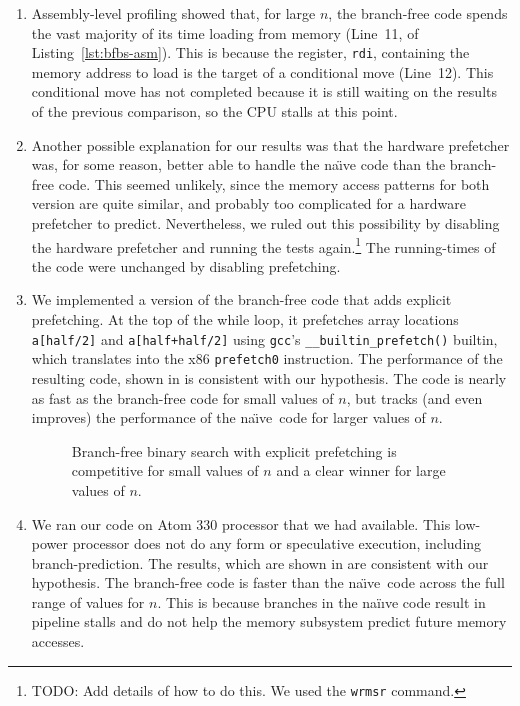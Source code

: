 \documentclass{patmorin}
\newcommand{\lstref}[1]{Listing~\ref{lst:#1}}
\newcommand{\naive}{na\"{\i}ve}
\begin{document}
\begin{enumerate}
\item Assembly-level profiling showed that, for large $n$, the
  branch-free code spends the vast majority of its time loading from
  memory (Line~11, of \lstref{bfbs-asm}).  This is because the register,
  \texttt{rdi},  containing the memory address to load is the
  target of a conditional move (Line~12).  This conditional move has not
  completed because it is still waiting on the results of the previous
  comparison, so the CPU stalls at this point.

\item Another possible explanation for our results was that the hardware
   prefetcher was, for some reason, better able to handle the \naive
   code than the branch-free code.  This seemed unlikely, since the memory
   access patterns for both version are quite similar, and probably too
   complicated for a hardware prefetcher to predict. Nevertheless, we
   ruled out this possibility by disabling the hardware prefetcher and
   running the tests again.\footnote{TODO: Add details of how to do this.
   We used the \texttt{wrmsr} command.}  The running-times
   of the code were unchanged by disabling prefetching.

\item We implemented a version of the branch-free code that adds explicit
   prefetching. At the top of the while loop, it
   prefetches array locations \texttt{a[half/2]}
   and \texttt{a[half+half/2]} using \texttt{gcc}'s
   \texttt{__builtin_prefetch()} builtin, which translates into
   the x86 \texttt{prefetch0} instruction.  The performance of
   the resulting code, shown in  is consistent with our
   hypothesis.  The code is nearly as fast as the branch-free code for
   small values of $n$, but tracks (and even improves) the performance
   of the \naive\ code for larger values of $n$.

\begin{figure}
   \caption{Branch-free binary search with explicit prefetching is competitive
    for small values of $n$ and a clear winner for large values of $n$.}
\end{figure}

\item We ran our code on Atom 330 processor that we had available.  This
   low-power processor does not do any form or speculative execution,
   including branch-prediction. The results, which are shown in
    are consistent with our hypothesis.  The
   branch-free code is faster than the \naive\ code across the full
   range of values for $n$.  This is because branches in the na\"i{\i}ve
   code result in pipeline stalls and do not help the memory subsystem
   predict future memory accesses.
\end{enumerate}
\end{document}
